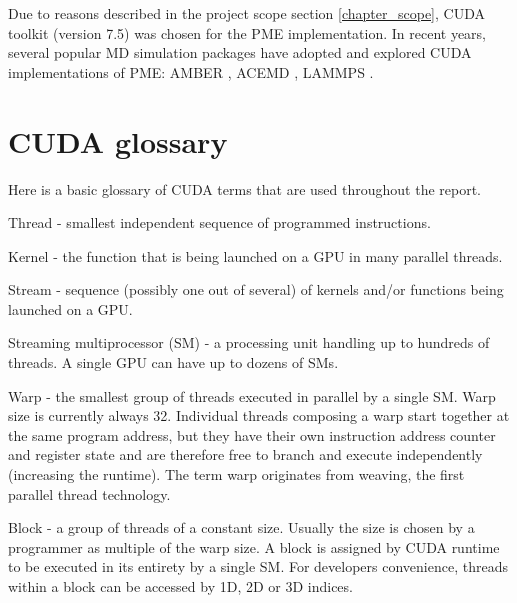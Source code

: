 \documentclass[12pt,a4paper]{report}
\begin{document}
Due to reasons described in the project scope section \ref{chapter_scope}, CUDA toolkit (version 7.5) was chosen for the PME implementation. In recent years, several popular MD simulation packages have adopted and explored CUDA implementations of PME: AMBER \cite{amber}, ACEMD \cite{acemd}, LAMMPS \cite{lammps}.


\section{CUDA glossary}
Here is a basic glossary of CUDA terms that are used throughout the report.
 

Thread - smallest independent sequence of programmed instructions.

Kernel - the function that is being launched on a GPU in many parallel threads.

Stream - sequence (possibly one out of several) of kernels and/or functions being launched on a GPU.

Streaming multiprocessor (SM) - a processing unit handling up to hundreds of threads. A single GPU can have up to dozens of SMs.

Warp - the smallest group of threads executed in parallel by a single SM. Warp size is currently always 32. Individual threads composing a warp start together at the same program address, but they have their own instruction address counter and register state and are therefore free to branch and execute independently (increasing the runtime). The term warp originates from weaving, the first parallel thread technology. 

Block - a group of threads of a constant size. Usually the size is chosen by a programmer as multiple of the warp size. A block is assigned by CUDA runtime to be executed in its entirety by a single SM. For developers convenience, threads within a block can be accessed by 1D, 2D or 3D indices.
\end{document}
